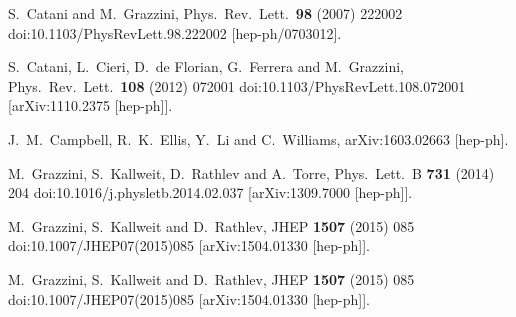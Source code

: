   S.~Catani and M.~Grazzini,
  Phys.\ Rev.\ Lett.\  {\bf 98} (2007) 222002
  doi:10.1103/PhysRevLett.98.222002
  [hep-ph/0703012].




  S.~Catani, L.~Cieri, D.~de Florian, G.~Ferrera and M.~Grazzini,
  Phys.\ Rev.\ Lett.\  {\bf 108} (2012) 072001
  doi:10.1103/PhysRevLett.108.072001
  [arXiv:1110.2375 [hep-ph]].

  J.~M.~Campbell, R.~K.~Ellis, Y.~Li and C.~Williams,
  arXiv:1603.02663 [hep-ph].



  M.~Grazzini, S.~Kallweit, D.~Rathlev and A.~Torre,
  Phys.\ Lett.\ B {\bf 731} (2014) 204
  doi:10.1016/j.physletb.2014.02.037
  [arXiv:1309.7000 [hep-ph]].

  M.~Grazzini, S.~Kallweit and D.~Rathlev,
  JHEP {\bf 1507} (2015) 085
  doi:10.1007/JHEP07(2015)085
  [arXiv:1504.01330 [hep-ph]].


  M.~Grazzini, S.~Kallweit and D.~Rathlev,
  JHEP {\bf 1507} (2015) 085
  doi:10.1007/JHEP07(2015)085
  [arXiv:1504.01330 [hep-ph]].


